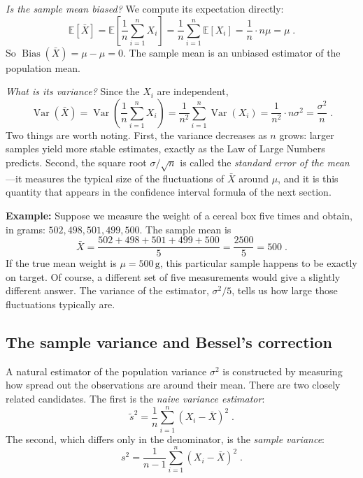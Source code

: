 \medskip

\textit{Is the sample mean biased?} We compute its expectation directly:
\[
    \mathbb{E}[\bar{X}]
    = \mathbb{E}\!\left[\frac{1}{n}\sum_{i=1}^n X_i\right]
    = \frac{1}{n}\sum_{i=1}^n \mathbb{E}[X_i]
    = \frac{1}{n} \cdot n\mu
    = \mu \; .
\]
So $\operatorname{Bias}(\bar{X}) = \mu - \mu = 0$. The sample mean is an unbiased estimator of the population mean.

\medskip

\textit{What is its variance?} Since the $X_i$ are independent,
\[
    \operatorname{Var}(\bar{X})
    = \operatorname{Var}\!\left(\frac{1}{n}\sum_{i=1}^n X_i\right)
    = \frac{1}{n^2}\sum_{i=1}^n \operatorname{Var}(X_i)
    = \frac{1}{n^2} \cdot n\sigma^2
    = \frac{\sigma^2}{n} \; .
\]
Two things are worth noting. First, the variance decreases as $n$ grows: larger samples yield more stable estimates, exactly as the Law of Large Numbers predicts. Second, the square root $\sigma/\sqrt{n}$ is called the \textit{standard error of the mean}---it measures the typical size of the fluctuations of $\bar{X}$ around $\mu$, and it is this quantity that appears in the confidence interval formula of the next section.

\medskip

\textbf{Example:} Suppose we measure the weight of a cereal box five times and obtain, in grams: $502, 498, 501, 499, 500$. The sample mean is
\[
    \bar{X} = \frac{502 + 498 + 501 + 499 + 500}{5} = \frac{2500}{5} = 500 \; .
\]
If the true mean weight is $\mu = 500\,\text{g}$, this particular sample happens to be exactly on target. Of course, a different set of five measurements would give a slightly different answer. The variance of the estimator, $\sigma^2/5$, tells us how large those fluctuations typically are.

\subsection*{The sample variance and Bessel's correction}

A natural estimator of the population variance $\sigma^2$ is constructed by measuring how spread out the observations are around their mean. There are two closely related candidates. The first is the \textit{naive variance estimator}:
\begin{equation}
    \tilde{s}^2 = \frac{1}{n} \sum_{i=1}^{n} (X_i - \bar{X})^2 \; .
\end{equation}
The second, which differs only in the denominator, is the \textit{sample variance}:
\begin{equation}
    s^2 = \frac{1}{n-1} \sum_{i=1}^{n} (X_i - \bar{X})^2 \; .
\end{equation}

